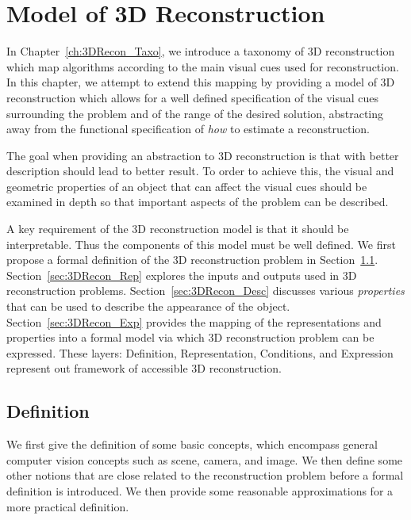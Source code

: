 
\chapter{Model of 3D Reconstruction}
\label{ch:3DRecon_Model}
In Chapter~\ref{ch:3DRecon_Taxo}, we introduce a taxonomy of 3D reconstruction which map algorithms according to the main visual cues used for reconstruction. In this chapter, we attempt to extend this mapping by providing a model of 3D reconstruction which allows for a well defined specification of the visual cues surrounding the problem and of the range of the desired solution, abstracting away from the functional specification of \textit{how} to estimate a reconstruction.

The goal when providing an abstraction to 3D reconstruction is that with better description should lead to better result. To order to achieve this, the visual and geometric properties of an object that can affect the visual cues should be examined in depth so that important aspects of the problem can be described.

A key requirement of the 3D reconstruction model is that it should be interpretable. Thus the components of this model must be well defined. We first propose a formal definition of the 3D reconstruction problem in Section~\ref{sec:3DRecon_Def}. Section~\ref{sec:3DRecon_Rep} explores the inputs and outputs used in 3D reconstruction problems. Section~\ref{sec:3DRecon_Desc} discusses various \textit{properties} that can be used to describe the appearance of the object. Section~\ref{sec:3DRecon_Exp} provides the mapping of the representations and properties into a formal model via which 3D reconstruction problem can be expressed. These layers: Definition, Representation, Conditions, and Expression represent out framework of accessible 3D reconstruction.

\section{Definition}
\label{sec:3DRecon_Def}
We first give the definition of some basic concepts, which encompass general computer vision concepts such as scene, camera, and image. We then define some other notions that are close related to the reconstruction problem before a formal definition is introduced. We then provide some reasonable approximations for a more practical definition.


